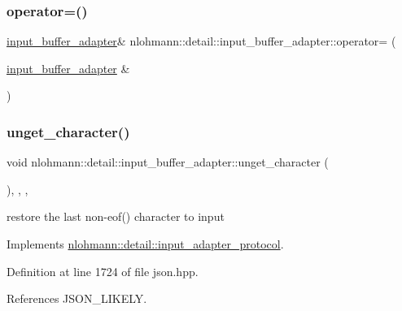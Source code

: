 \subsubsection{\texorpdfstring{operator=()}{operator=()}}
{\footnotesize\ttfamily \hyperlink{classnlohmann_1_1detail_1_1input__buffer__adapter}{input\+\_\+buffer\+\_\+adapter}\& nlohmann\+::detail\+::input\+\_\+buffer\+\_\+adapter\+::operator= (\begin{DoxyParamCaption}\item[{\hyperlink{classnlohmann_1_1detail_1_1input__buffer__adapter}{input\+\_\+buffer\+\_\+adapter} \&}]{ }\end{DoxyParamCaption})\hspace{0.3cm}{\ttfamily [delete]}}

\mbox{\label{classnlohmann_1_1detail_1_1input__buffer__adapter_ae2464d8e963d2ae617b080f2df2550a1}} 
\subsubsection{\texorpdfstring{unget\+\_\+character()}{unget\_character()}}
{\footnotesize\ttfamily void nlohmann\+::detail\+::input\+\_\+buffer\+\_\+adapter\+::unget\+\_\+character (\begin{DoxyParamCaption}{ }\end{DoxyParamCaption})\hspace{0.3cm}{\ttfamily [inline]}, {\ttfamily [override]}, {\ttfamily [virtual]}, {\ttfamily [noexcept]}}



restore the last non-\/eof() character to input 



Implements \hyperlink{structnlohmann_1_1detail_1_1input__adapter__protocol_aeb5cac3e86e8df6cfe48cc42de2e9225}{nlohmann\+::detail\+::input\+\_\+adapter\+\_\+protocol}.



Definition at line 1724 of file json.\+hpp.



References J\+S\+O\+N\+\_\+\+L\+I\+K\+E\+LY.


